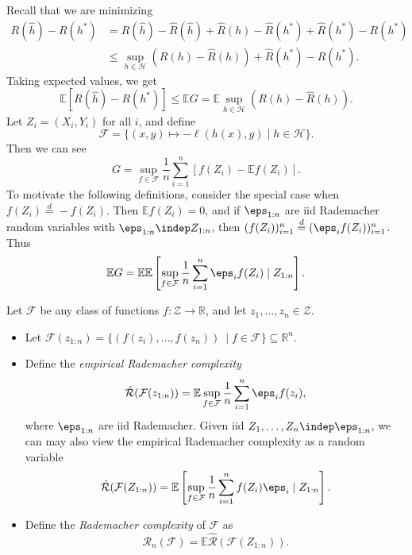 \documentclass[12pt]{article}
\begin{document}
Recall that we are minimizing
\begin{align*}
	R(\hat h) - R(h^\ast) &= R(\hat h) - \hat R(\hat h) + \hat R(h) - \hat R(h^\ast) + \hat R(h^\ast) - R(h^\ast) \\
			      &\leq \sup_{h \in \mathcal{H}} (R(h) - \hat R(h)) + \hat R(h^\ast) - R(h^\ast).
\end{align*}
Taking expected values, we get
\[
\mathbb{E}[R(\hat h) - R(h^\ast)] \leq \mathbb{E} G = \mathbb{E} \sup_{h \in \mathcal{H}} (R(h) - \hat R(h)).
\]
Let $Z_i = (X_i, Y_i)$ for all $i$, and define
\[
	\mathcal{F} = \{(x, y) \mapsto - \ell(h(x), y) \mid h \in \mathcal{H}\}.
\]
Then we can see
\[
	G = \sup_{f \in \mathcal{F}} \frac{1}{n}\sum_{i = 1}^n [f(Z_i) - \mathbb{E} f(Z_i)].
\]
To motivate the following definitions, consider the special case when $f(Z_i) \overset d = -f(Z_i)$. Then $\mathbb{E} f(Z_i) = 0$, and if $\eps_{1:n}$ are iid Rademacher random variables with $\eps_{1:n} \indep Z_{1:n}$, then $(f(Z_i))_{i = 1}^n \overset d = (\eps_i f(Z_i))_{i = 1}^n$. Thus
\begin{align*}
	\mathbb{E} G = \mathbb{E} \mathbb{E}\left[ \sup_{f \in \mathcal{F}} \frac{1}{n} \sum_{i = 1}^n \eps_i f(Z_i) \mid Z_{1:n} \right].
\end{align*}

\begin{definition}
	Let $\mathcal{F}$ be any class of functions $f : \mathcal{Z} \to \mathbb{R}$, and let $z_1, \ldots, z_n \in \mathcal{Z}$.
	\begin{itemize}
		\item Let $\mathcal{F}(z_{1:n}) = \{(f(z_i), \ldots, f(z_n))\ \mid f \in \mathcal{F}\} \subseteq \mathbb{R}^n$.
		\item Define the \emph{empirical Rademacher complexity}
			\[
				\hat{\mathcal{R}} (\mathcal{F}(z_{1:n})) = \mathbb{E} \sup_{f \in \mathcal{F}} \frac{1}{n} \sum_{i = 1}^n \eps_i f(z_i),
			\]
		where $\eps_{1:n}$ are iid Rademacher. Given iid $Z_1, \ldots, Z_n \indep \eps_{1:n}$, we can may also view the empirical Rademacher complexity as a random variable
		\[
			\hat{\mathcal{R}} (\mathcal{F}(Z_{1:n})) = \mathbb{E}\left[ \sup_{f \in \mathcal{F}} \frac{1}{n} \sum_{i = 1}^n f(Z_i) \eps_i \mid Z_{1:n} \right].
		\]
	\item Define the \emph{Rademacher complexity} of $\mathcal{F}$ as
		\[
			\mathcal{R}_n(\mathcal{F}) = \mathbb{E} \hat{\mathcal{R}}(\mathcal{F}(Z_{1:n})).
		\]
	\end{itemize}
\end{definition}
\end{document}
